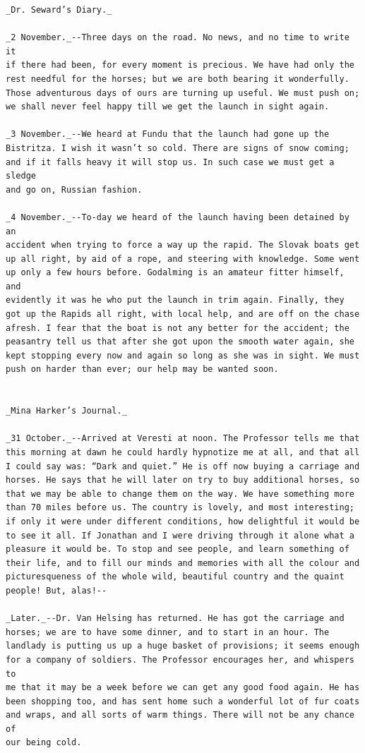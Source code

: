 \documentclass{article}
\begin{document}
\begin{verbatim}
_Dr. Seward’s Diary._

_2 November._--Three days on the road. No news, and no time to write it
if there had been, for every moment is precious. We have had only the
rest needful for the horses; but we are both bearing it wonderfully.
Those adventurous days of ours are turning up useful. We must push on;
we shall never feel happy till we get the launch in sight again.

_3 November._--We heard at Fundu that the launch had gone up the
Bistritza. I wish it wasn’t so cold. There are signs of snow coming;
and if it falls heavy it will stop us. In such case we must get a sledge
and go on, Russian fashion.

_4 November._--To-day we heard of the launch having been detained by an
accident when trying to force a way up the rapid. The Slovak boats get
up all right, by aid of a rope, and steering with knowledge. Some went
up only a few hours before. Godalming is an amateur fitter himself, and
evidently it was he who put the launch in trim again. Finally, they
got up the Rapids all right, with local help, and are off on the chase
afresh. I fear that the boat is not any better for the accident; the
peasantry tell us that after she got upon the smooth water again, she
kept stopping every now and again so long as she was in sight. We must
push on harder than ever; our help may be wanted soon.


_Mina Harker’s Journal._

_31 October._--Arrived at Veresti at noon. The Professor tells me that
this morning at dawn he could hardly hypnotize me at all, and that all
I could say was: “Dark and quiet.” He is off now buying a carriage and
horses. He says that he will later on try to buy additional horses, so
that we may be able to change them on the way. We have something more
than 70 miles before us. The country is lovely, and most interesting;
if only it were under different conditions, how delightful it would be
to see it all. If Jonathan and I were driving through it alone what a
pleasure it would be. To stop and see people, and learn something of
their life, and to fill our minds and memories with all the colour and
picturesqueness of the whole wild, beautiful country and the quaint
people! But, alas!--

_Later._--Dr. Van Helsing has returned. He has got the carriage and
horses; we are to have some dinner, and to start in an hour. The
landlady is putting us up a huge basket of provisions; it seems enough
for a company of soldiers. The Professor encourages her, and whispers to
me that it may be a week before we can get any good food again. He has
been shopping too, and has sent home such a wonderful lot of fur coats
and wraps, and all sorts of warm things. There will not be any chance of
our being cold.


\end{verbatim}
\end{document}
